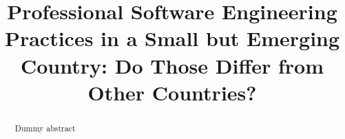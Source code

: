 \documentclass[acmsmall,table,xcdraw]{acmart}
\title{Professional Software Engineering Practices in a Small but Emerging Country: Do Those Differ from Other Countries?}
\begin{document}
\begin{abstract}
Dummy abstract
\end{abstract}
\maketitle



% 
% 


% 
% 
% 





\pagebreak
\appendix

    
\end{document}
